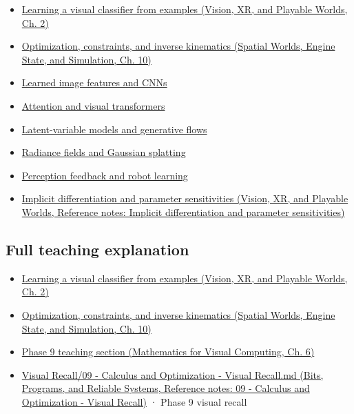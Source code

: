 \begin{itemize}
\tightlist
\item
  \href{../07-Vision-XR-and-Playable-Worlds/main.pdf\#nameddest=04-visual-computing-ii-ch031-learning-a-visual-classifier-from-examples}{Learning a visual classifier from examples (Vision, XR, and Playable Worlds, Ch. 2)}
\item
  \href{../05-Spatial-Worlds-Engine-State-and-Simulation/main.pdf\#nameddest=04-visual-computing-ii-ch029-optimization-constraints-and-inverse-kinematics}{Optimization, constraints, and inverse kinematics (Spatial Worlds, Engine State, and Simulation, Ch. 10)}
\item
  \hyperref[appendix-47c51ea026fb]{Learned image features and CNNs}
\item
  \hyperref[appendix-a9d5dfdd164a]{Attention and visual transformers}
\item
  \hyperref[appendix-2c568f05ee34]{Latent-variable models and generative flows}
\item
  \hyperref[appendix-c5b332e400e7]{Radiance fields and Gaussian splatting}
\item
  \hyperref[appendix-b0c42da325f1]{Perception feedback and robot learning}
\item
  \href{../07-Vision-XR-and-Playable-Worlds/main.pdf\#nameddest=appendix-8836553d56fc}{Implicit differentiation and parameter sensitivities (Vision, XR, and Playable Worlds, Reference notes: Implicit differentiation and parameter sensitivities)}
\end{itemize}

\subsection{Full teaching explanation}\label{appendix-40df0855b4a7-full-teaching-explanation}

\begin{itemize}
\tightlist
\item
  \href{../07-Vision-XR-and-Playable-Worlds/main.pdf\#nameddest=04-visual-computing-ii-ch031-learning-a-visual-classifier-from-examples}{Learning a visual classifier from examples (Vision, XR, and Playable Worlds, Ch. 2)}
\item
  \href{../05-Spatial-Worlds-Engine-State-and-Simulation/main.pdf\#nameddest=04-visual-computing-ii-ch029-optimization-constraints-and-inverse-kinematics}{Optimization, constraints, and inverse kinematics (Spatial Worlds, Engine State, and Simulation, Ch. 10)}
\item
  \href{../02-Mathematics-for-Visual-Computing/main.pdf\#nameddest=02-foundations-ii-ch022-numerical-differentiation-and-automatic-differentiation}{Phase 9 teaching section (Mathematics for Visual Computing, Ch. 6)}
\item
  \href{../01-Bits-Programs-and-Reliable-Systems/main.pdf\#nameddest=appendix-adf48f5dc5c1}{Visual Recall/09 - Calculus and Optimization - Visual Recall.md (Bits, Programs, and Reliable Systems, Reference notes: 09 - Calculus and Optimization - Visual Recall)} · Phase 9 visual recall
\end{itemize}


